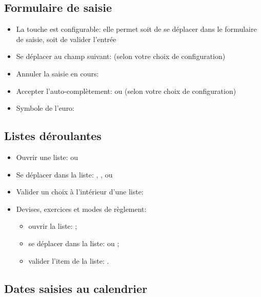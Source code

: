 \subsection{Formulaire de saisie }

\begin{itemize}
	\item La touche  est configurable: elle permet soit de se déplacer dans le formulaire de saisie, soit de valider l'entrée
	\item Se déplacer au champ suivant:  (selon votre choix de configuration)
	\item Annuler la saisie en cours: 
	\item Accepter l'auto-complètement:  ou  (selon votre choix de configuration)
	\item Symbole de l'euro: 
\end{itemize}


\subsection{Listes déroulantes}

\begin{itemize}
	 \item Ouvrir une liste:  ou 
	 \item Se déplacer dans la liste: , ,  ou 
	 \item Valider un choix à l'intérieur d'une liste: 
	 \item Devises, exercices et modes de règlement:
		\begin{itemize}
			\item ouvrir la liste: ; 
			\item se déplacer dans la liste:  ou ;
			\item valider l'item de la liste: .
		\end{itemize}
\end{itemize}


\subsection{Dates saisies au calendrier}

